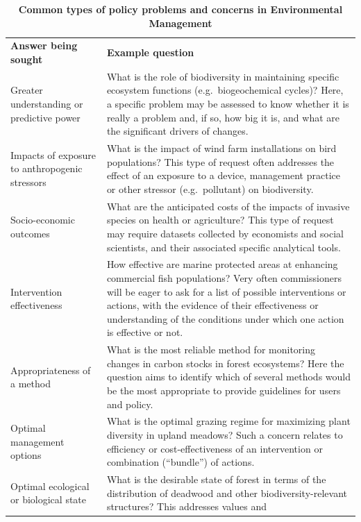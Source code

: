 \documentclass[
  letterpaper,
  DIV=11,
  numbers=noendperiod]{scrreprt}
\begin{document}
\begin{longtable}[]{@{}
  >{\raggedright\arraybackslash}p{}
  >{\raggedright\arraybackslash}p{}@{}}
\caption{\textbf{Common types of policy problems and concerns in
Environmental Management}}\label{tbl-commontype}\tabularnewline
\toprule\noalign{}
\endfirsthead
\endhead
\bottomrule\noalign{}
\endlastfoot
\textbf{Answer being sought} & \textbf{Example question} \\
Greater understanding or predictive power & What is the role of
biodiversity in maintaining specific ecosystem functions
(e.g.~biogeochemical cycles)? Here, a specific problem may be assessed
to know whether it is really a problem and, if so, how big it is, and
what are the significant drivers of changes. \\
Impacts of exposure to anthropogenic stressors & What is the impact of
wind farm installations on bird populations? This type of request often
addresses the effect of an exposure to a device, management practice or
other stressor (e.g.~pollutant) on biodiversity. \\
Socio-economic outcomes & What are the anticipated costs of the impacts
of invasive species on health or agriculture? This type of request may
require datasets collected by economists and social scientists, and
their associated specific analytical tools. \\
Intervention effectiveness & How effective are marine protected areas at
enhancing commercial fish populations? Very often commissioners will be
eager to ask for a list of possible interventions or actions, with the
evidence of their effectiveness or understanding of the conditions under
which one action is effective or not. \\
Appropriateness of a method & What is the most reliable method for
monitoring changes in carbon stocks in forest ecosystems? Here the
question aims to identify which of several methods would be the most
appropriate to provide guidelines for users and policy. \\
Optimal management options & What is the optimal grazing regime for
maximizing plant diversity in upland meadows? Such a concern relates to
efficiency or cost-effectiveness of an intervention or combination
(``bundle'') of actions. \\
Optimal ecological or biological state & What is the desirable state of
forest in terms of the distribution of deadwood and other
biodiversity-relevant structures? This addresses values and

\end{longtable}
\end{document}
